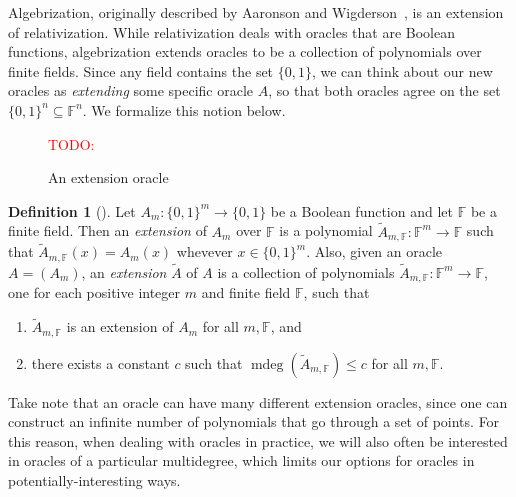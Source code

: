 \documentclass[english,12pt]{reedthesis}
\theoremstyle{plain}
\theoremstyle{definition}
\newtheorem{defn}[defn]{Definition}
\theoremstyle{remark}
\DeclareMathOperator{\mdeg}{mdeg}
\newcommand{\TODO}[1]{\textcolor{red}{TODO: #1}}
\begin{document}
Algebrization, originally described by Aaronson and Wigderson~\cite{AW09}, is an
extension of relativization. While relativization deals with oracles that are
Boolean functions, algebrization extends oracles to be a collection of
polynomials over finite fields. Since any field contains the set $\{0, 1\}$, we
can think about our new oracles as \emph{extending} some specific oracle $A$, so
that both oracles agree on the set $\{0, 1\}^{n} \subseteq \mathbb{F}^{n}$. We formalize
this notion below.

\begin{figure}[htbp]
  \TODO{}
  \caption{An extension oracle}\label{fig:ext-oracle}
\end{figure}

\begin{defn}[{\cite[Def.\ 2.2]{AW09}}]\label{def:ext-oracle}
  Let $A_{m}\colon \{0, 1\}^{m} \rightarrow \{0, 1\}$ be a Boolean function and let
  $\mathbb{F}$ be a finite field. Then an \emph{extension} of $A_{m}$ over
  $\mathbb{F}$ is a polynomial
  $\tilde{A}_{m,\mathbb{F}}\colon \mathbb{F}^{m} \rightarrow \mathbb{F}$ such that
  $\tilde{A}_{m,\mathbb{F}}(x) = A_{m}(x)$ whevever $x \in \{0, 1\}^{m}$. Also,
  given an oracle $A = (A_{m})$, an \emph{extension} $\tilde{A}$ of $A$ is a
  collection of polynomials
  $\tilde{A}_{m,\mathbb{F}}\colon \mathbb{F}^{m} \rightarrow \mathbb{F}$, one for each
  positive integer $m$ and finite field $\mathbb{F}$, such that
  \begin{enumerate}
    \item $\tilde{A}_{m,\mathbb{F}}$ is an extension of $A_{m}$ for all
          $m,\mathbb{F}$, and
    \item there exists a constant $c$ such that
          $\mdeg(\tilde{A}_{m,\mathbb{F}}) \le c$ for all $m, \mathbb{F}$.
  \end{enumerate}
\end{defn}

Take note that an oracle can have many different extension oracles, since one
can construct an infinite number of polynomials that go through a set of points.
For this reason, when dealing with oracles in practice, we will also often be
interested in oracles of a particular multidegree, which limits our options for
oracles in potentially-interesting ways.
\end{document}
